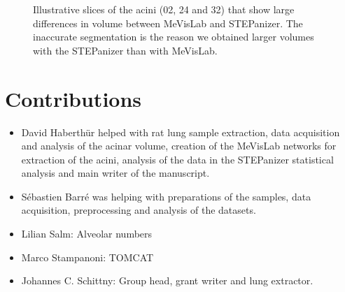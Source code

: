 \documentclass[%
	paper=a4,%
	DIV=calc,%
	twoside=true,%
	abstract=true,%
	]{scrartcl}
\newcommand{\imsize}{\linewidth}
\begin{document}
\renewcommand{\imsize}{0.33\linewidth}%
\setlength\fboxsep{0pt}%
\begin{figure}
	\centering
	\hfill%
	\hfill%
	\caption{Illustrative slices of the acini (02, 24 and 32) that show large differences in volume between MeVisLab and STEPanizer. The inaccurate segmentation is the reason we obtained larger volumes with the STEPanizer than with MeVisLab.}
	\label{fig:MeVisSegmentation}
\end{figure}

\section{Contributions}
\begin{itemize}
	\item David Haberthür helped with rat lung sample extraction, data acquisition and analysis of the acinar volume, creation of the MeVisLab networks for extraction of the acini, analysis of the data in the STEPanizer statistical analysis and main writer of the manuscript.
	\item Sébastien Barré was helping with preparations of the samples, data acquisition,  preprocessing and analysis of the datasets.
	\item Lilian Salm: Alveolar numbers
	\item Marco Stampanoni: TOMCAT
	\item Johannes C. Schittny: Group head, grant writer and lung extractor.
\end{itemize}
\end{document}
